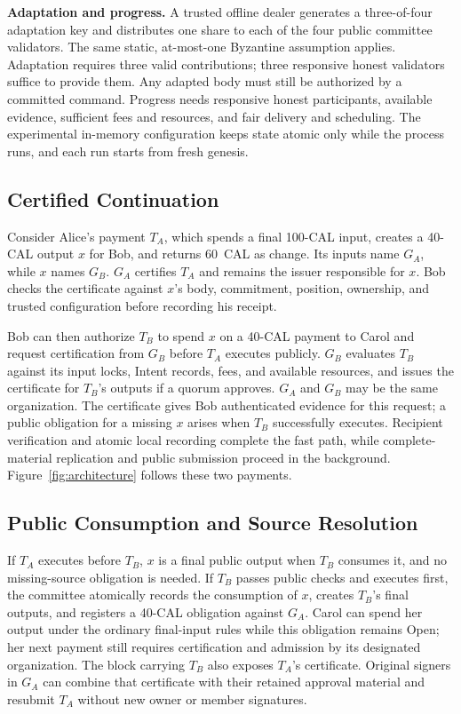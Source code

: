 \noindent\textbf{Adaptation and progress.}
A trusted offline dealer generates a three-of-four adaptation key and distributes one share to each of the four public committee validators. The same static, at-most-one Byzantine assumption applies. Adaptation requires three valid contributions; three responsive honest validators suffice to provide them. Any adapted body must still be authorized by a committed command. Progress needs responsive honest participants, available evidence, sufficient fees and resources, and fair delivery and scheduling. The experimental in-memory configuration keeps state atomic only while the process runs, and each run starts from fresh genesis.

\subsection{Certified Continuation}
\label{sec:model-example}

Consider Alice's payment $T_A$, which spends a final 100-CAL input, creates a 40-CAL output $x$ for Bob, and returns 60~CAL as change. Its inputs name $G_A$, while $x$ names $G_B$. $G_A$ certifies $T_A$ and remains the issuer responsible for $x$. Bob checks the certificate against $x$'s body, commitment, position, ownership, and trusted configuration before recording his receipt.

Bob can then authorize $T_B$ to spend $x$ on a 40-CAL payment to Carol and request certification from $G_B$ before $T_A$ executes publicly. $G_B$ evaluates $T_B$ against its input locks, Intent records, fees, and available resources, and issues the certificate for $T_B$'s outputs if a quorum approves. $G_A$ and $G_B$ may be the same organization. The certificate gives Bob authenticated evidence for this request; a public obligation for a missing $x$ arises when $T_B$ successfully executes. Recipient verification and atomic local recording complete the fast path, while complete-material replication and public submission proceed in the background. Figure~\ref{fig:architecture} follows these two payments.



\subsection{Public Consumption and Source Resolution}
\label{sec:model-contract}

If $T_A$ executes before $T_B$, $x$ is a final public output when $T_B$ consumes it, and no missing-source obligation is needed. If $T_B$ passes public checks and executes first, the committee atomically records the consumption of $x$, creates $T_B$'s final outputs, and registers a 40-CAL obligation against $G_A$. Carol can spend her output under the ordinary final-input rules while this obligation remains Open; her next payment still requires certification and admission by its designated organization. The block carrying $T_B$ also exposes $T_A$'s certificate. Original signers in $G_A$ can combine that certificate with their retained approval material and resubmit $T_A$ without new owner or member signatures.

